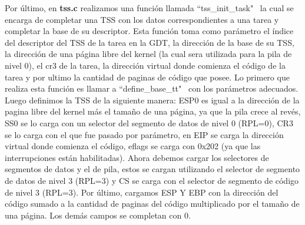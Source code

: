 \documentclass[a4paper]{article}
\begin{document}
\justify
Por último, en \textbf{tss.c} realizamos una función llamada ``tss_init_task" \ la cual se encarga de completar una TSS con los datos correspondientes a una tarea y completar la base de su descriptor. Esta función toma como parámetro el índice del descriptor del TSS de la tarea en la GDT, la dirección de la base de su TSS, la dirección de una página libre del kernel (la cual sera utilizada para la pila de nivel $0$), el cr3 de la tarea, la dirección virtual donde comienza el código de la tarea y por ultimo la cantidad de paginas de código que posee.
\justify
Lo primero que realiza esta función es llamar a  ``define_base_tt" \ con los parámetros adecuados. Luego definimos la TSS de la siguiente manera: ESP0 es igual a la dirección de la pagina libre del kernel más el tamaño de una página, ya que la pila crece al revés, SS0 se lo carga con un selector del segmento de datos de nivel 0 (RPL=0), CR3 se lo carga con el que fue pasado por parámetro, en EIP se carga la dirección virtual donde comienza el código, eflags se carga con 0x202 (ya que las interrupciones están habilitadas). Ahora debemos cargar los selectores de segmentos de datos y el de pila, estos se cargan utilizando el selector de segmento de datos de nivel 3 (RPL=3) y CS se carga con el selector de segmento de código de nivel 3 (RPL=3). Por último, cargamos ESP Y EBP con la dirección del código sumado a la cantidad de paginas del código multiplicado por el tamaño de una página. Los demás campos se completan con 0.
\end{document}

